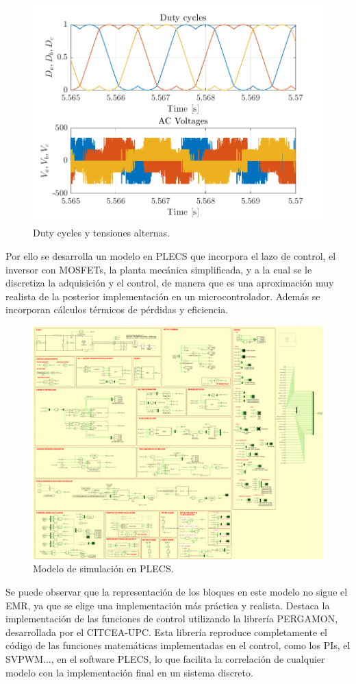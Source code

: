 \begin{figure}[H]
    \centering
    \includegraphics[width=0.85\linewidth]{fig/abc_plot.png}
    \caption{Duty cycles y tensiones alternas.}
    
\end{figure}


Por ello se desarrolla un modelo en PLECS que incorpora el lazo de control, el inversor con MOSFETs, la planta mecánica simplificada, y a la cual se le discretiza la adquisición y el control, de manera que es una aproximación muy realista de la posterior implementación en un microcontrolador. Además se incorporan cálculos térmicos de pérdidas y eficiencia.

\begin{figure}[H]
	\centering
	\includegraphics[width=0.7\linewidth]{fig/PLECS_overall}
	\caption{Modelo de simulación en PLECS.}
\end{figure}


Se puede observar que la representación de los bloques en este modelo no sigue el EMR, ya que se elige una implementación más práctica y realista. Destaca la implementación de las funciones de control utilizando la librería PERGAMON, desarrollada por el CITCEA-UPC. Esta librería reproduce completamente el código de las funciones matemáticas implementadas en el control, como los PIs, el SVPWM..., en el software PLECS, lo que facilita la correlación de cualquier modelo con la implementación final en un sistema discreto.


